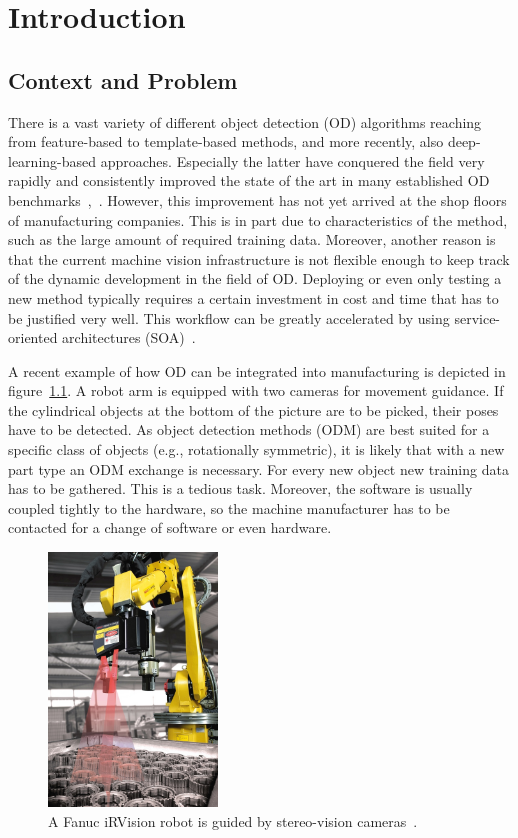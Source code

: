 \chapter{Introduction\label{cha:chapter1}}
\section{Context and Problem}
There is a vast variety of different object detection (OD) algorithms reaching from feature-based to template-based methods, and more recently, also deep-learning-based approaches. Especially the latter have conquered the field very rapidly and consistently improved the state of the art in many established OD benchmarks~\cite{Houben2013DetectionBenchmark},~\cite{Geiger2012AreSuite}. However, this improvement has not yet arrived at the shop floors of manufacturing companies. This is in part due to characteristics of the method, such as the large amount of required training data. Moreover, another reason is that the current machine vision infrastructure is not flexible enough to keep track of the dynamic development in the field of OD. Deploying or even only testing a new method typically requires a certain investment in cost and time that has to be justified very well. This workflow can be greatly accelerated by using service-oriented architectures (SOA)~\cite{Rudorfer2018IndustrialServices}.

A recent example of how OD can be integrated into manufacturing is depicted in figure~\ref{fig:fanuc}. A robot arm is equipped with two cameras for movement guidance. If the cylindrical objects at the bottom of the picture are to be picked, their poses have to be detected. As object detection methods (ODM) are best suited for a specific class of objects (e.g., rotationally symmetric), it is likely that with a new part type an ODM exchange is necessary. For every new object new training data has to be gathered. This is a tedious task. Moreover, the software is usually coupled tightly to the hardware, so the machine manufacturer has to be contacted for a change of software or even hardware. 
\begin{figure}[ht]
    \centering
    \includegraphics[width=0.4\textwidth]{img/Fanuc_iRVision.png}
    \caption{A Fanuc iRVision robot is guided by stereo-vision cameras~\cite{Gonzalez2017Smart2019}.}
    \label{fig:fanuc}
\end{figure}


